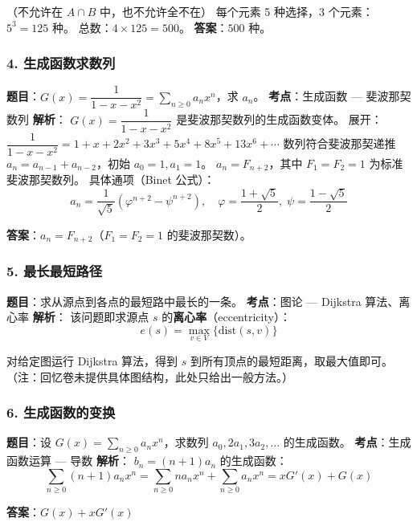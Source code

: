 \documentclass[10pt,a4paper,openany]{ctexbook}
\theoremstyle{definition}
\theoremstyle{remark}
\begin{document}
（不允许在 $A \cap B$ 中，也不允许全不在）
每个元素 5 种选择，3 个元素：$5^3 = 125$ 种。
总数：$4 \times 125 = 500$。
\textbf{答案}：$\boxed{500}$ 种。
\vspace{-2pt}

\subsubsection{4. 生成函数求数列}

\textbf{题目}：$G(x) = \dfrac{1}{1-x-x^2} = \sum_{n \ge 0} a_n x^n$，求 $a_n$。
\textbf{考点}：生成函数 — 斐波那契数列
\textbf{解析}：
$G(x) = \dfrac{1}{1-x-x^2}$ 是斐波那契数列的生成函数变体。
展开：$\dfrac{1}{1-x-x^2} = 1 + x + 2x^2 + 3x^3 + 5x^4 + 8x^5 + 13x^6 + \cdots$
数列符合斐波那契递推 $a_n = a_{n-1} + a_{n-2}$，初始 $a_0 = 1, a_1 = 1$。
$a_n = F_{n+2}$，其中 $F_1 = F_2 = 1$ 为标准斐波那契数列。
具体通项（Binet 公式）：
\[
 a_n = \frac{1}{\sqrt{5}}\left(\varphi^{n+2} - \psi^{n+2}\right),\quad \varphi = \frac{1+\sqrt{5}}{2},\; \psi = \frac{1-\sqrt{5}}{2} 
\]

\textbf{答案}：$\boxed{a_n = F_{n+2}}$（$F_1=F_2=1$ 的斐波那契数）。
\vspace{-2pt}

\subsubsection{5. 最长最短路径}

\textbf{题目}：求从源点到各点的最短路中最长的一条。
\textbf{考点}：图论 — Dijkstra 算法、离心率
\textbf{解析}：
该问题即求源点 $s$ 的\textbf{离心率}（eccentricity）：
\[
 e(s) = \max_{v \in V} \{\text{dist}(s, v)\} 
\]

对给定图运行 Dijkstra 算法，得到 $s$ 到所有顶点的最短距离，取最大值即可。
（注：回忆卷未提供具体图结构，此处只给出一般方法。）
\vspace{-2pt}

\subsubsection{6. 生成函数的变换}

\textbf{题目}：设 $G(x) = \sum_{n \ge 0} a_n x^n$，求数列 $a_0, 2a_1, 3a_2, \dots$ 的生成函数。
\textbf{考点}：生成函数运算 — 导数
\textbf{解析}：
$b_n = (n+1)a_n$ 的生成函数：
\[
 \sum_{n \ge 0} (n+1)a_n x^n = \sum_{n \ge 0} n a_n x^n + \sum_{n \ge 0} a_n x^n = x G'(x) + G(x) 
\]

\textbf{答案}：$\boxed{G(x) + x G'(x)}$
\vspace{-2pt}
\end{document}
